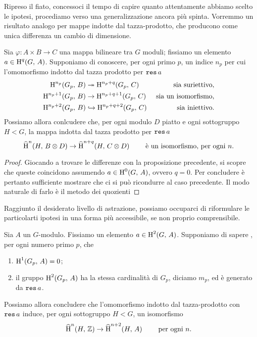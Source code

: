 Ripreso il fiato, concessoci il tempo di capire quanto attentamente abbiamo scelto le ipotesi, procediamo verso una generalizzazione ancora più spinta. Vorremmo un risultato analogo per mappe indotte dal tazza-prodotto, che producono come unica differenza un cambio di dimensione.

\begin{proposition}
	Sia $ \varphi \colon A \times B \to C $ una mappa bilineare tra $ G $ moduli; fissiamo un elemento $ a \in \operatorname{H}^q(G, \, A) $. Supponiamo di conoscere, per ogni primo $ p $, un indice $ n_p $ per cui l'omomorfismo indotto dal tazza prodotto per $ \operatorname{\mathtt{res}} a $
	\begin{align*}
	\operatorname{H}^{n_p}(G_p,\, B) &\twoheadrightarrow \operatorname{H}^{n_p+q}(G_p,\, C) & \text{ sia suriettivo,} \\
	\operatorname{H}^{n_p+1}(G_p,\, B) &\to \operatorname{H}^{n_p+q+1}(G_p,\, C) & \text{ sia un isomorfismo,} \\
	\operatorname{H}^{n_p+2}(G_p,\, B) &\hookrightarrow \operatorname{H}^{n_p+q+2}(G_p,\, C) & \text{ sia iniettivo.}
	\end{align*}
	Possiamo allora conlcudere che, per ogni modulo $ D $ piatto e ogni sottogruppo $ H < G $, la mappa indotta dal tazza prodotto per $ \operatorname{\mathtt{res}} a $
	\[ \operatorname{\widehat{H}}^n(H, \, B \otimes D) \to \operatorname{\widehat{H}}^{n+q}(H, \,  C\otimes D) \qquad\text{ è un isomorfismo, per ogni } n. \]
\end{proposition}

\begin{proof}
	Giocando a trovare le differenze con la proposizione precedente, si scopre che queste coincidono assumendo $ a \in \operatorname{H}^0(G, \, A) $, ovvero $ q = 0. $ Per concludere è pertanto sufficiente mostrare che ci si può ricondurre al caso precedente. Il modo naturale di farlo è il metodo dei quozienti 
\end{proof}

Raggiunto il desiderato livello di astrazione, possiamo occuparci di riformulare le particolarti ipotesi in una forma più accessibile, se non proprio comprensibile.

\begin{theorem}
	Sia $ A $ un $ G $-modulo. Fissiamo un elemento $ a \in \operatorname{H}^2(G, \, A) $. Supponiamo di sapere , per ogni numero primo $ p $, che
	\begin{enumerate}
		\item $ \operatorname{H}^1(G_p, \, A) = 0 $;
		\item il gruppo $ \operatorname{H}^2(G_p, \, A) $ ha la stessa cardinalità di $ G_p $, diciamo $ m_p $, ed è generato da $ \operatorname{\mathtt{res}} a $.
	\end{enumerate}
	Possiamo allora concludere che l'omomorfismo indotto dal tazza-prodotto con $ \operatorname{\mathtt{res}} a $ induce, per ogni sottogruppo $ H < G $, un isomorfismo
	\[ \operatorname{\widehat{H}}^n(H, \, \mathbb{Z}) \to \operatorname{\widehat{H}}^{n+2}(H, \,  A) \qquad \text{ per ogni } n.\]
\end{theorem}

